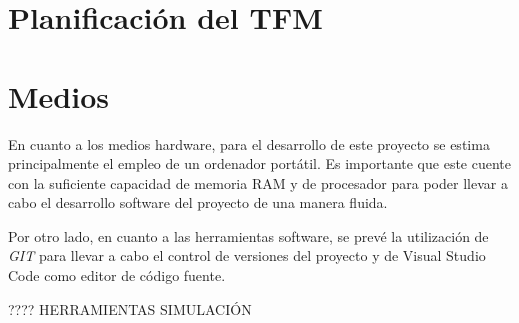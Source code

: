 \begin{comment}

La metodología propuesta para la realización del proyecto es la de Proceso Unificado enfocado al desarrollo de software, la cual se caracteriza por estar dirigido por casos de uso, centrado en la arquitectura del sistema y por ser iterativo e incremental. En este proyecto, según se podrá apreciar en la Planificación del TFM (Sección \ref{sec:planificacion}), se plantean 7 iteraciones totales, en las cuales se pasará de forma secuencial por las siguientes etapas:

\begin{itemize}
    \item \textbf{Diseño del entorno} 
    \item \textbf{Desarrollo}
    \item \textbf{Validación del desarrollo}
\end{itemize}
\end{comment}

\newpage

\section{Planificación del TFM}
\label{sec:planificacion}


\section{Medios}

\vspace{0.3cm}
En cuanto a los medios hardware, para el desarrollo de este proyecto se estima principalmente el empleo de un ordenador portátil. Es importante que este cuente con la suficiente capacidad de memoria RAM y de procesador para poder llevar a cabo el desarrollo software del proyecto de una manera fluida.

\vspace{0.3cm}
Por otro lado, en cuanto a las herramientas software, se prevé la utilización de \textit{GIT} para llevar a cabo el control de versiones del proyecto y de Visual Studio Code como editor de código fuente.

???? HERRAMIENTAS SIMULACIÓN

\newpage

